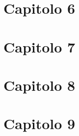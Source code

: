 \section*{Capitolo 6}
\def\thesection{6.1}
\begin{esercizi}
	\item
	\item
	\item
	\item
	\item
\end{esercizi}
\section*{Capitolo 7}
\def\thesection{7.1}
\begin{esercizi}
	\item
	\item
	\item
	\item
	\item
\end{esercizi}
\section*{Capitolo 8}
\def\thesection{8.1}
\begin{esercizi}
	\item
	\item
	\item
	\item
	\item
\end{esercizi}
\section*{Capitolo 9}
\def\thesection{9.1}
\begin{esercizi}
	\item
	\item
	\item
	\item
	\item
\end{esercizi}
